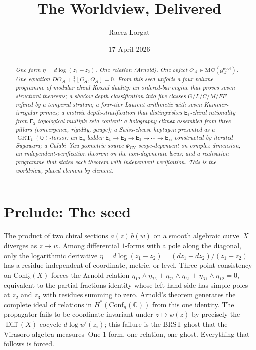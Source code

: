 \documentclass[11pt]{article}
\title{\bfseries The Worldview, Delivered}
\author{Raeez Lorgat}
\date{17 April 2026}
\providecommand{\cA}{\mathcal{A}}
\providecommand{\bC}{\mathbb{C}}
\providecommand{\bQ}{\mathbb{Q}}
\providecommand{\MC}{\mathrm{MC}}
\providecommand{\gAmod}{\mathfrak{g}_{\cA}^{\mathrm{mod}}}
\providecommand{\Eone}{\mathsf{E}_{1}}
\providecommand{\Etwo}{\mathsf{E}_{2}}
\providecommand{\Ethree}{\mathsf{E}_{3}}
\providecommand{\Einf}{\mathsf{E}_{\infty}}
\providecommand{\En}{\mathsf{E}_{n}}
\providecommand{\Phicy}{\Phi_{\mathrm{CY}}}
\providecommand{\GRTone}{\operatorname{GRT}_{1}}
\begin{document}
\maketitle

\begin{abstract}
\noindent\itshape
One form $\eta = d\log(z_1 - z_2)$. One relation (Arnold). One object
$\Theta_\cA \in \MC(\gAmod)$. One equation
$D\Theta_\cA + \tfrac{1}{2}[\Theta_\cA,\Theta_\cA]=0$. From this seed
unfolds a four-volume programme of modular chiral Koszul duality: an
ordered-bar engine that proves seven structural theorems; a
shadow-depth classification into five classes $G/L/C/M/FF$ refined by
a tempered stratum; a four-tier Laurent arithmetic with seven
Kummer-irregular primes; a motivic depth-stratification that
distinguishes $\Eone$-chiral rationality from $\Etwo$-topological
multiple-zeta content; a holography climax assembled from three
pillars (convergence, rigidity, gauge); a Swiss-cheese heptagon
presented as a $\GRTone(\bQ)$-torsor; an $\En$ ladder
$\Eone\to\Etwo\to\Ethree\to\cdots\to\Einf$ constructed by iterated
Sugawara; a Calabi--Yau geometric source $\Phicy$ scope-dependent on
	complex dimension; an independent-verification theorem on the
	non-degenerate locus; and a realisation programme that states each
	theorem with independent verification. This is the worldview, placed
	element by element.
\end{abstract}

\section*{Prelude: The seed}

\noindent
The product of two chiral sections $a(z)\,b(w)$ on a smooth algebraic
curve~$X$ diverges as $z\to w$. Among differential $1$-forms with a
pole along the diagonal, only the logarithmic derivative
$\eta = d\log(z_1 - z_2) = (dz_1 - dz_2)/(z_1 - z_2)$ has a residue
independent of coordinate, metric, or level. Three-point
consistency on $\mathrm{Conf}_3(X)$ forces the Arnold relation
$\eta_{12}\wedge\eta_{23} + \eta_{23}\wedge\eta_{31}
+ \eta_{31}\wedge\eta_{12} = 0$, equivalent to the
partial-fractions identity whose left-hand side has simple poles at
$z_2$ and $z_3$ with residues summing to zero. Arnold's theorem
generates the complete ideal of relations in
$H^*(\mathrm{Conf}_n(\bC))$ from this one identity. The propagator
fails to be coordinate-invariant under $z\mapsto w(z)$ by precisely
the $\operatorname{Diff}(X)$-cocycle $d\log w'(z_i)$; this failure is
the BRST ghost that the Virasoro algebra measures. One $1$-form, one
relation, one ghost. Everything that follows is forced.
\end{document}
